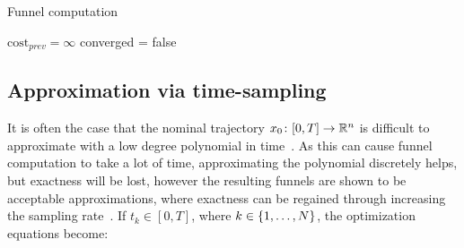 \begin{algorithm}[p]
  \caption{Funnel computation}
  \label{alg:funnelalgorithm}
  \DontPrintSemicolon \SetAlgoNoLine

   

  \(\textrm{cost}_{\mathit{prev}} = \infty\)\; converged = false \; \;
\end{algorithm}

\subsection{Approximation via time-sampling}

It is often the case that the nominal trajectory \(x_{0} \colon [0,T]
\rightarrow \mathbb{R}^n\) is difficult to approximate with a low degree polynomial in
time~\cite{majumdarFunnelLibrariesRealtime2017}. As this can cause funnel
computation to take a lot of time, approximating the polynomial discretely
helps, but exactness will be lost, however the resulting funnels are shown to be
acceptable approximations, where exactness can be regained through increasing
the sampling rate~\cite{Tobenkin_2011}. If \(t_{k} \in [0,T]\), where \(k \in
\lbrace1,\ldots,N\rbrace\), the optimization equations become:

